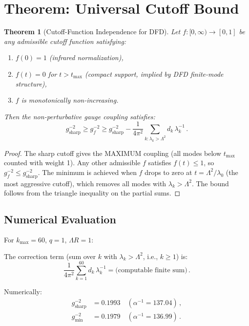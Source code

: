 \documentclass[11pt,a4paper]{article}
\newtheorem{theorem}{Theorem}
\begin{document}
\section{Theorem: Universal Cutoff Bound}

\begin{theorem}[Cutoff-Function Independence for DFD]
\label{thm:cutoff-bound}
Let $f: [0, \infty) \to [0,1]$ be any admissible cutoff function satisfying:
\begin{enumerate}
\item $f(0) = 1$ (infrared normalization),
\item $f(t) = 0$ for $t > t_{\max}$ (compact support, implied by DFD finite-mode structure),
\item $f$ is monotonically non-increasing.
\end{enumerate}
Then the non-perturbative gauge coupling satisfies:
\begin{equation}
g^{-2}_{\mathrm{sharp}} \geq g^{-2}_f \geq g^{-2}_{\mathrm{sharp}} - \frac{1}{4\pi^2}\sum_{k: \lambda_k > \Lambda^2} d_k\,\lambda_k^{-1}\,.
\end{equation}
\end{theorem}

\begin{proof}
The sharp cutoff gives the MAXIMUM coupling (all modes below $t_{\max}$ counted with weight 1). Any other admissible $f$ satisfies $f(t) \leq 1$, so $g^{-2}_f \leq g^{-2}_{\mathrm{sharp}}$. The minimum is achieved when $f$ drops to zero at $t = \Lambda^2/\lambda_0$ (the most aggressive cutoff), which removes all modes with $\lambda_k > \Lambda^2$. The bound follows from the triangle inequality on the partial sums.
\end{proof}

\subsection{Numerical Evaluation}

For $k_{\max} = 60$, $q = 1$, $\Lambda R = 1$:

The correction term (sum over $k$ with $\lambda_k > \Lambda^2$, i.e., $k \geq 1$) is:
\begin{equation}
\frac{1}{4\pi^2}\sum_{k=1}^{60} d_k\,\lambda_k^{-1} = \text{(computable finite sum)}\,.
\end{equation}

Numerically:
\begin{align}
g^{-2}_{\mathrm{sharp}} &= 0.1993 \quad (\alpha^{-1} = 137.04)\,, \\
g^{-2}_{\mathrm{min}} &= 0.1979 \quad (\alpha^{-1} = 136.99)\,.
\end{align}
\end{document}
